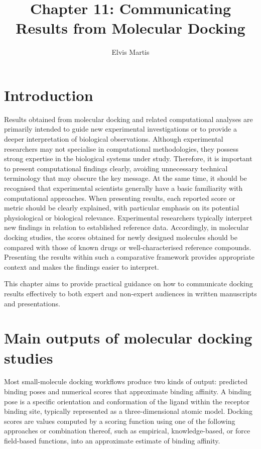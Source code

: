 \documentclass[12pt]{article}
\title{Chapter 11: Communicating Results from Molecular Docking}
\author{Elvis Martis}
\begin{document}
\maketitle


\section{Introduction}
Results obtained from molecular docking and related computational analyses are primarily intended to guide new experimental investigations or to provide a deeper interpretation of biological observations. Although experimental researchers may not specialise in computational methodologies, they possess strong expertise in the biological systems under study. Therefore, it is important to present computational findings clearly, avoiding unnecessary technical terminology that may obscure the key message. At the same time, it should be recognised that experimental scientists generally have a basic familiarity with computational approaches. When presenting results, each reported score or metric should be clearly explained, with particular emphasis on its potential physiological or biological relevance. Experimental researchers typically interpret new findings in relation to established reference data. Accordingly, in molecular docking studies, the scores obtained for newly designed molecules should be compared with those of known drugs or well-characterised reference compounds. Presenting the results within such a comparative framework provides appropriate context and makes the findings easier to interpret.

 This chapter aims to provide practical guidance on how to communicate docking results effectively to both expert and non-expert audiences in written manuscripts and presentations\cite{CH11_Berry2015,CH11_Forli2015,CH11_IsItReliable2018}. 


\section{Main outputs of molecular docking studies}

Most small-molecule docking workflows produce two kinds of output: predicted binding poses and numerical scores that approximate binding affinity\cite{CH11_Kitchen2004,CH11_Pagadala2017,CH11_AutoDockVina2010}.  A binding pose is a specific orientation and conformation of the ligand within the receptor binding site, typically represented as a three-dimensional atomic model\cite{CH11_Kitchen2004,CH11_Glide2004,CH11_cosconati2010}.  Docking scores are values computed by a scoring function using one of the following approaches or combination thereof, such as empirical, knowledge-based, or force field-based functions, into an approximate estimate of binding affinity\cite{CH11_Jain2006,CH11_EmpiricalScoring2018,CH11_Warren2006}. 
\end{document}
